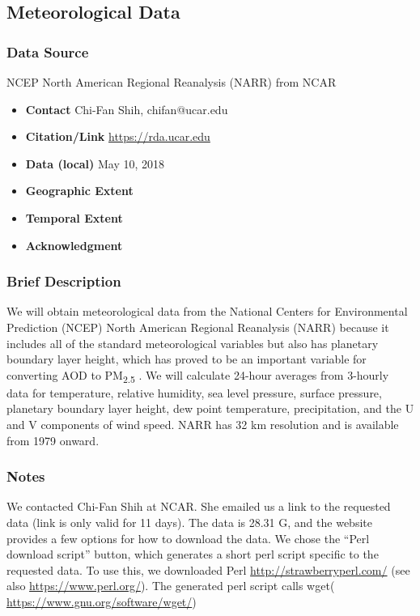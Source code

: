 \subsection{Meteorological Data}
\subsubsection*{Data Source} NCEP North American Regional Reanalysis (NARR) from NCAR
\begin{itemize}[nolistsep]
\item \textbf{Contact} Chi-Fan Shih, chifan@ucar.edu
\item \textbf{Citation/Link} \url{https://rda.ucar.edu}
\item \textbf{Data (local)} May 10, 2018
\item \textbf{Geographic Extent}
\item \textbf{Temporal Extent}
\item \textbf{Acknowledgment}
\end{itemize}
\subsubsection*{Brief Description}

We will obtain meteorological data from the National Centers for Environmental Prediction (NCEP) North American Regional Reanalysis (NARR) \citep{Mesinger2006,NCEPReanalysis2005} because it includes all of the standard meteorological variables but also has planetary boundary layer height, which has proved to be an important variable for converting AOD to PM\textsubscript{2.5} \citep{liu_estimating_2005}. We will calculate 24-hour averages from 3-hourly data for temperature, relative humidity, sea level pressure, surface pressure, planetary boundary layer height, dew point temperature, precipitation, and the U and V components of wind speed. NARR has 32 km resolution and is available from 1979 onward. 

\subsubsection*{Notes}

We contacted Chi-Fan Shih at NCAR. She emailed us a link to the requested data (link is only valid for 11 days). The data is 28.31 G, and the website provides a few options for how to download the data. We chose the ``Perl download script'' button, which generates a short perl script specific to the requested data. To use this, we downloaded Perl \url{http://strawberryperl.com/} (see also \url{https://www.perl.org/}). The generated perl script calls wget( \url{https://www.gnu.org/software/wget/})




